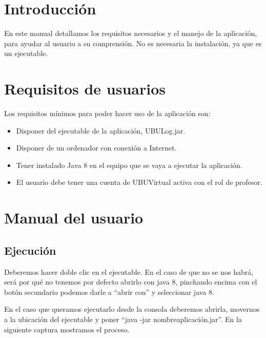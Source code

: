 
\section{Introducción}

En este manual detallamos los requisitos necesarios y el manejo de la aplicación, para ayudar al usuario a su comprensión. No es necesaria la instalación, ya que es un ejecutable.

\section{Requisitos de usuarios}

Los requisitos mínimos para poder hacer uso de la aplicación son:

\begin{itemize}
	\tightlist
	\item
	Disponer del ejecutable de la aplicación, UBULog.jar.
	\item
	Disponer de un ordenador con conexión a Internet.
	\item
	Tener instalado Java 8 en el equipo que se vaya a ejecutar la aplicación.
	\item
	El usuario debe tener una cuenta de UBUVirtual activa con el rol de profesor.
\end{itemize}


\section{Manual del usuario}

\subsection{Ejecución}

Deberemos hacer doble clic en el ejecutable. En el caso de que no se nos habrá, será por qué no tenemos por defecto abrirlo con java 8, pinchando encima con el botón secundario podemos darle a ``abrir con'' y seleccionar java 8.

En el caso que queramos ejecutarlo desde la consola deberemos abrirla, movernos a la ubicación del ejecutable y poner ``java -jar nombreaplicación.jar''. En la siguiente captura mostramos el proceso.

